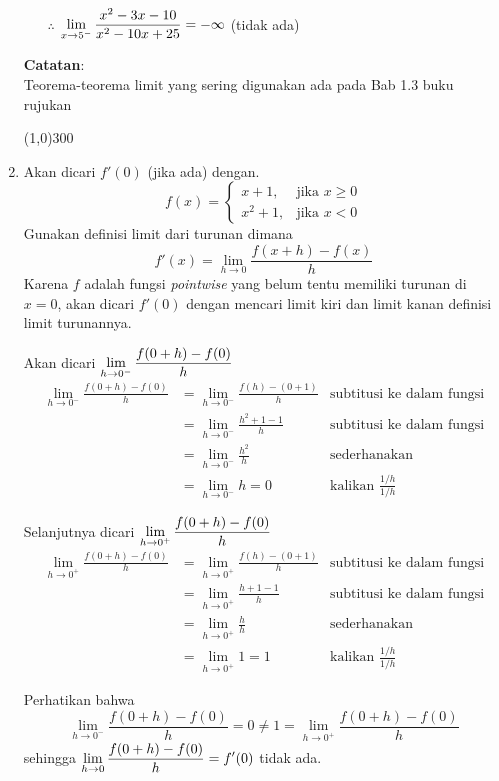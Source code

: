 \begin{enumerate}[leftmargin=*, label={\arabic*}.]
\begin{enumerate}[label={\alph*}.]
    $\therefore$
    $\displaystyle \lim_{x\to 5^{-}} \frac{x^{2}-3x-10}{x^{2}-10x+25} = -\infty$ 
    (tidak ada)
\end{enumerate}
\vspace{0.1cm}
\textbf{Catatan}:\\
Teorema-teorema limit yang sering digunakan ada pada Bab 1.3 buku rujukan \cite{valberg}
\begin{center}
    \line(1,0){300}
\end{center}
\item Akan dicari $f'(0)$ (jika ada) dengan.
\[
f(x) = 
\begin{cases}
    x+1, &\text{jika $x \geq 0$}\\
    x^{2}+1, &\text{jika $x < 0$}
\end{cases}
\]
Gunakan definisi limit dari turunan dimana
\[
f'(x) = \lim_{h\to 0} \frac{f(x+h)-f(x)}{h}
\]
Karena $f$ adalah fungsi \textit{pointwise} yang belum tentu memiliki turunan 
di $x=0$, akan dicari $f'(0)$ dengan mencari limit kiri dan limit kanan definisi 
limit turunannya.

Akan dicari $\displaystyle \lim_{h\to 0^{-}} \frac{f(0+h)-f(0)}{h}$
\begin{align*}
    \lim_{h\to 0^{-}} \frac{f(0+h)-f(0)}{h}
    &= \lim_{h\to 0^{-}} \frac{f(h)-(0+1)}{h}
    &\text{subtitusi ke dalam fungsi}\\
    &= \lim_{h\to 0^{-}} \frac{h^{2}+1-1}{h}
    &\text{subtitusi ke dalam fungsi}\\
    &= \lim_{h\to 0^{-}} \frac{h^{2}}{h}
    &\text{sederhanakan}\\
    &= \lim_{h\to 0^{-}} h = 0
    &\text{kalikan $\frac{1/h}{1/h}$}
\end{align*}

Selanjutnya dicari $\displaystyle \lim_{h\to 0^{+}} \frac{f(0+h)-f(0)}{h}$
\begin{align*}
    \lim_{h\to 0^{+}} \frac{f(0+h)-f(0)}{h}
    &= \lim_{h\to 0^{+}} \frac{f(h)-(0+1)}{h}
    &\text{subtitusi ke dalam fungsi}\\
    &= \lim_{h\to 0^{+}} \frac{h+1-1}{h}
    &\text{subtitusi ke dalam fungsi}\\
    &= \lim_{h\to 0^{+}} \frac{h}{h}
    &\text{sederhanakan}\\
    &= \lim_{h\to 0^{+}} 1 = 1
    &\text{kalikan $\frac{1/h}{1/h}$}
\end{align*}

Perhatikan bahwa
\[
\lim_{h\to 0^{-}} \frac{f(0+h)-f(0)}{h} = 0 
\neq 1 = \lim_{h\to 0^{+}} \frac{f(0+h)-f(0)}{h}
\]
sehingga $\displaystyle \lim_{h\to 0} \frac{f(0+h)-f(0)}{h} = f'(0)$ tidak ada.


\end{enumerate}
